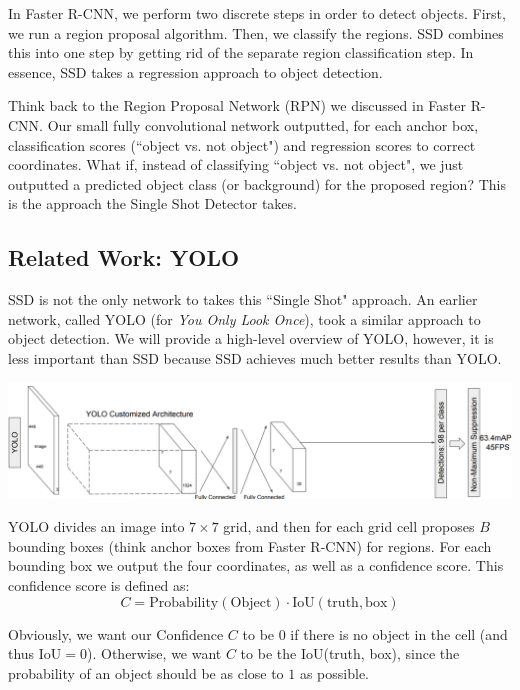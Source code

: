 \documentclass{article}
\begin{document}
In Faster R-CNN, we perform two discrete steps in order to detect objects. First, we run a region proposal algorithm. Then, we classify the regions. SSD combines this into one step by getting rid of the separate region classification step. In essence, SSD takes a regression approach to object detection.

Think back to the Region Proposal Network (RPN) we discussed in Faster R-CNN. Our small fully convolutional network outputted, for each anchor box, classification scores (``object vs. not object") and regression scores to correct coordinates. What if, instead of classifying ``object vs. not object", we just outputted a predicted object class (or background) for the proposed region? This is the approach the Single Shot Detector takes.

\subsection{Related Work: YOLO}

SSD is not the only network to takes this ``Single Shot" approach. An earlier network, called YOLO (for \textit{You Only Look Once}), took a similar approach to object detection. We will provide a high-level overview of YOLO, however, it is less important than SSD because SSD achieves much better results than YOLO.

\begin{center}
\includegraphics[scale=0.42]{yolo.PNG}
\end{center}

YOLO divides an image into $7\times7$ grid, and then for each grid cell proposes $B$ bounding boxes (think anchor boxes from Faster R-CNN) for regions. For each bounding box we output the four coordinates, as well as a confidence score. This confidence score is defined as:
\[C = \text{Probability}(\text{Object}) \cdot \text{IoU}(\text{truth}, \text{box})\]

Obviously, we want our Confidence $C$ to be $0$ if there is no object in the cell (and thus IoU$=0$). Otherwise, we want $C$ to be the IoU(truth, box), since the probability of an object should be as close to $1$ as possible.
\end{document}
